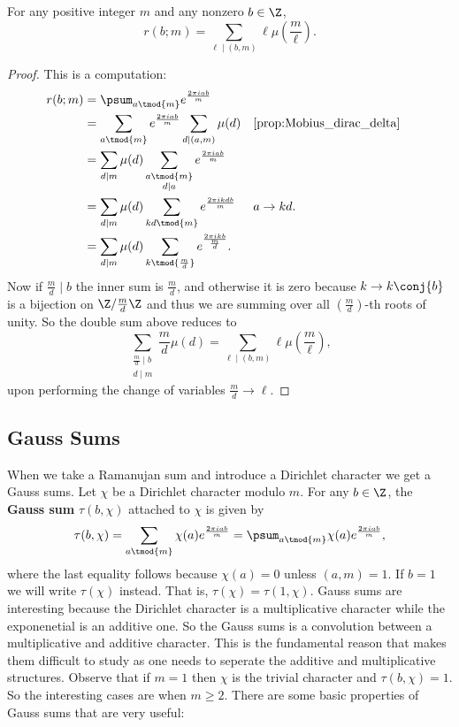         \begin{proposition}\label{prop:Ramanujan_sum_evaluation}
          For any positive integer $m$ and any nonzero $b \in \Z$,
          \[
            r(b;m) = \sum_{\ell \mid (b,m)}\ell\mu\left(\frac{m}{\ell}\right).
          \]
        \end{proposition}
        \begin{proof}
          This is a computation:
          \begin{align*}
            r(b;m) &= \psum_{a \tmod{m}}e^{\frac{2\pi iab}{m}} \\
            &= \sum_{a \tmod{m}}e^{\frac{2\pi iab}{m}}\sum_{d \mid (a,m)}\mu(d) && \text{\cref{prop:Mobius_dirac_delta}} \\
            &= \sum_{d \mid m}\mu(d)\sum_{\substack{a \tmod{m} \\ d \mid a}}e^{\frac{2\pi iab}{m}} \\
            &= \sum_{d \mid m}\mu(d)\sum_{kd \tmod{m}}e^{\frac{2\pi ikdb}{m}} && \text{$a \to kd$.} \\
            &= \sum_{d \mid m}\mu(d)\sum_{k \tmod{\frac{m}{d}}}e^{\frac{2\pi ik b}{\frac{m}{d}}}.
          \end{align*}
          Now if $\frac{m}{d} \mid b$ the inner sum is $\frac{m}{d}$, and otherwise it is zero because $k \to k\conj{b}$ is a bijection on $\Z/\frac{m}{d}\Z$ and thus we are summing over all $\left(\frac{m}{d}\right)$-th roots of unity. So the double sum above reduces to
          \[
            \sum_{\substack{\frac{m}{d} \mid b \\ d \mid m}}\frac{m}{d}\mu(d) = \sum_{\ell \mid (b,m)}\ell\mu\left(\frac{m}{\ell}\right),
          \]
          upon performing the change of variables $\frac{m}{d} \to \ell$.
        \end{proof}
      \subsection*{Gauss Sums}
        When we take a Ramanujan sum and introduce a Dirichlet character we get a Gauss sums. Let $\chi$ be a Dirichlet character modulo $m$. For any $b \in \Z$, the \textbf{Gauss sum} $\tau(b,\chi)$ attached to $\chi$ is given by
        \[
          \tau(b,\chi) = \sum_{a \tmod{m}}\chi(a)e^{\frac{2\pi iab}{m}} = \psum_{a \tmod{m}}\chi(a)e^{\frac{2\pi iab}{m}},
        \]
        where the last equality follows because $\chi(a) = 0$ unless $(a,m) = 1$. If $b = 1$ we will write $\tau(\chi)$ instead. That is, $\tau(\chi) = \tau(1,\chi)$. Gauss sums are interesting because the Dirichlet character is a multiplicative character while the exponenetial is an additive one. So the Gauss sums is a convolution between a multiplicative and additive character. This is the fundamental reason that makes them difficult to study as one needs to seperate the additive and multiplicative structures. Observe that if $m = 1$ then $\chi$ is the trivial character and $\tau(b,\chi) = 1$. So the interesting cases are when $m \ge 2$. There are some basic properties of Gauss sums that are very useful:

